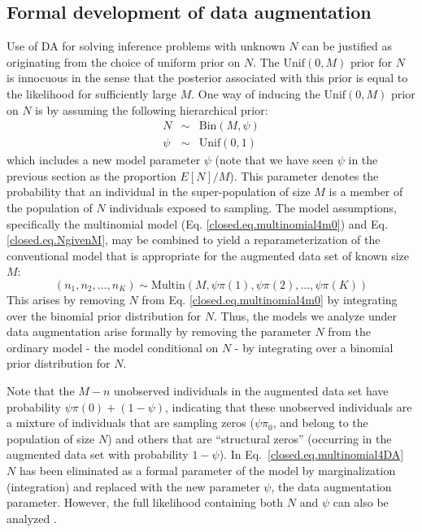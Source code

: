 \subsection{Formal development of data augmentation}

Use of DA for solving inference problems with unknown $N$ can be
justified as originating from the choice of uniform prior on $N$.  The
$\mathrm{Unif}(0,M)$ prior for $N$ is innocuous in the sense that the
posterior associated with this prior is equal to the likelihood for
sufficiently large $M$.  One way of inducing the $\mathrm{Unif}(0,M)$
prior on $N$ is by assuming the following hierarchical prior:
\begin{eqnarray}
\label{closed.eq.NgivenM}
  N &\sim& \mathrm{Bin}(M, \psi) \\ \nonumber
  \psi &\sim& \mathrm{Unif}(0,1)
\end{eqnarray}
which includes a new model parameter $\psi$ 
(note that we have seen $\psi$ in the previous section as the proportion $E[N]/M$). 
This parameter denotes
the probability that an individual in the super-population of size $M$
is a member of the population of $N$ individuals exposed to sampling.
The model assumptions, specifically the multinomial model 
(Eq. \ref{closed.eq.multinomial4m0})
and Eq. \ref{closed.eq.NgivenM}, may be combined to yield a
reparameterization of the conventional model that is appropriate for
the augmented data set of known size $M$:
\begin{equation}
\label{closed.eq.multinomial4DA}
    (n_1, n_2, \ldots, n_K) \sim \mathrm{Multin}(M, \psi  \pi(1), \psi \pi(2), \ldots, \psi \pi(K))
\end{equation}
This arises by removing $N$ from Eq. \ref{closed.eq.multinomial4m0} by 
integrating
over the binomial prior distribution for $N$. Thus, the models we
analyze under data augmentation arise formally by removing the
parameter $N$ from the ordinary model - the model conditional on $N$ -
by integrating over a binomial prior distribution for $N$.

Note that the $M-n$ unobserved individuals in the augmented data set
have probability $\psi \pi(0) + (1-\psi)$, indicating that these
unobserved individuals are a mixture of individuals that are sampling
zeros ($\psi \pi_0$, and belong to the population of size $N$) and
others that are ``structural zeros'' (occurring in the augmented data
set with probability $1 - \psi$). In Eq.~\ref{closed.eq.multinomial4DA} $N$
has been eliminated as a formal parameter of the model by
marginalization (integration) and replaced with the new parameter
$\psi$, the data augmentation parameter.
However, the full likelihood containing both $N$ and $\psi$ can also be
analyzed \citep[see][]{royle_etal:2007}.


